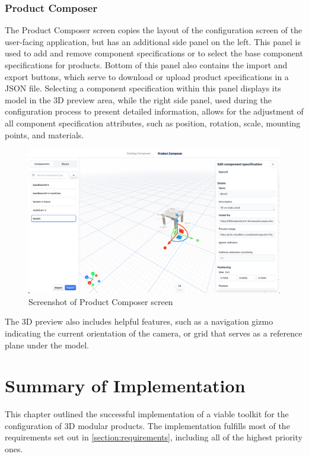 \subsubsection{Product Composer}

The Product Composer screen copies the layout of the configuration screen of the user-facing application, but has an additional side panel on the left. This panel is used to add and remove component specifications or to select the base component specifications for products. Bottom of this panel also contains the import and export buttons, which serve to download or upload product specifications in a JSON file. Selecting a component specification within this panel displays its model in the 3D preview area, while the right side panel, used during the configuration process to present detailed information, allows for the adjustment of all component specification attributes, such as position, rotation, scale, mounting points, and materials.

\begin{figure}[h!]
\centering
\includegraphics[width=\textwidth]{images/screenshot_productcomposer.png}
\caption{Screenshot of Product Composer screen}
\label{fig:screenshot-produtcomposer}
\end{figure}

The 3D preview also includes helpful features, such as a navigation gizmo indicating the current orientation of the camera, or grid that serves as a reference plane under the model.

\section{Summary of Implementation}

This chapter outlined the successful implementation of a viable toolkit for the configuration of 3D modular products. The implementation fulfills most of the requirements set out in \autoref{section:requirements}, including all of the highest priority ones.

